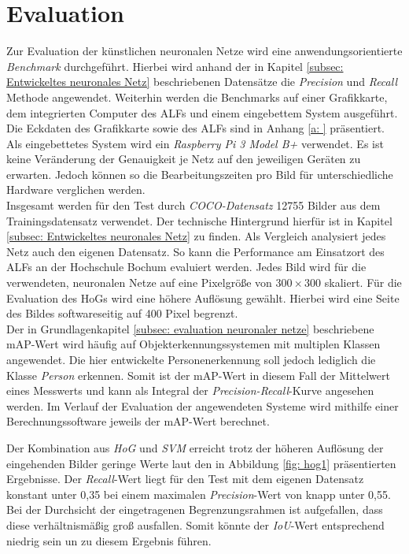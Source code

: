 \chapter{Evaluation}
\label{ch: Verifikation}
Zur Evaluation der künstlichen neuronalen Netze wird eine anwendungsorientierte \textit{Benchmark} durchgeführt. Hierbei wird anhand der in Kapitel \ref{subsec: Entwickeltes neuronales Netz} beschriebenen Datensätze die \textit{Precision} und \textit{Recall} Methode angewendet. Weiterhin werden die Benchmarks auf einer Grafikkarte, dem integrierten Computer des ALFs und einem eingebettem System ausgeführt. Die Eckdaten des Grafikkarte sowie des ALFs sind in Anhang \ref{a: } präsentiert. Als eingebettetes System wird ein \textit{Raspberry Pi 3 Model B+} verwendet. Es ist keine Veränderung der Genauigkeit je Netz auf den jeweiligen Geräten zu erwarten. Jedoch können so die Bearbeitungszeiten pro Bild für unterschiedliche Hardware verglichen werden. \\

Insgesamt werden für den Test durch \textit{COCO-Datensatz} 12755 Bilder aus dem Trainingsdatensatz verwendet. Der technische Hintergrund hierfür ist in Kapitel \ref{subsec: Entwickeltes neuronales Netz} zu finden. Als Vergleich analysiert jedes Netz auch den eigenen Datensatz. So kann die Performance am Einsatzort des ALFs an der Hochschule Bochum evaluiert werden. Jedes Bild wird für die verwendeten, neuronalen Netze auf eine Pixelgröße von $300 \times 300$ skaliert. Für die Evaluation des HoGs wird eine höhere Auflösung gewählt. Hierbei wird eine Seite des Bildes softwareseitig auf 400 Pixel begrenzt.\\

Der in Grundlagenkapitel \ref{subsec: evaluation neuronaler netze} beschriebene mAP-Wert wird häufig auf Objekterkennungssystemen mit multiplen Klassen angewendet. Die hier entwickelte Personenerkennung soll jedoch lediglich die Klasse \textit{Person} erkennen. Somit ist der mAP-Wert in diesem Fall der Mittelwert eines Messwerts und kann als Integral der \textit{Precision-Recall}-Kurve angesehen werden. Im Verlauf der Evaluation der angewendeten Systeme wird mithilfe einer Berechnungssoftware jeweils der mAP-Wert berechnet.
 


Der Kombination aus \textit{HoG} und \textit{SVM} erreicht trotz der höheren Auflösung der eingehenden Bilder geringe Werte laut den in Abbildung \ref{fig: hog1} präsentierten Ergebnisse. Der \textit{Recall}-Wert liegt für den Test mit dem eigenen Datensatz konstant unter 0,35 bei einem maximalen \textit{Precision}-Wert von knapp unter 0,55. Bei der Durchsicht der eingetragenen Begrenzungsrahmen ist aufgefallen, dass diese verhältnismäßig groß ausfallen. Somit könnte der \textit{IoU}-Wert entsprechend niedrig sein un zu diesem Ergebnis führen.


